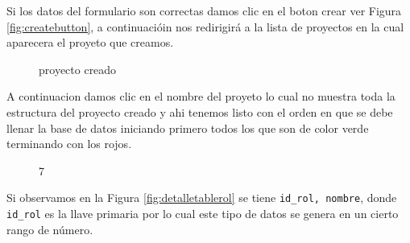 Si los datos del formulario son correctas damos clic en el boton crear ver Figura \ref{fig:createbutton}, a continuaci\'oin nos redirigir\'a a la lista de proyectos en la cual aparecera el proyeto que creamos. 
\begin{figure}[H]
\caption{proyecto creado} \label{fig:viewprojectcreated}
\centering
{}
\end{figure}
A continuacion damos clic en el nombre del proyeto lo cual no muestra toda la estructura del proyecto creado y ahi tenemos listo con el orden en que se debe llenar la base de datos iniciando primero todos los que son de color verde terminando con los rojos.
\begin{figure}[H]
\caption{7}
\centering
{}
\end{figure}
Si observamos en la Figura \ref{fig:detalletablerol} se tiene \texttt{id\_rol, nombre}, donde \texttt{id\_rol} es la llave primaria por lo cual este tipo de datos se genera en un cierto rango de n\'umero.

